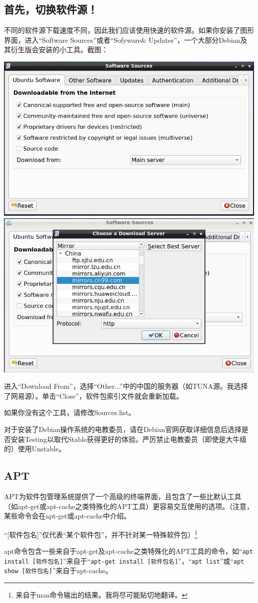 \subsection{首先，切换软件源！}
不同的软件源下载速度不同，因此我们应该使用快速的软件源。如果你安装了图形界面，进入“Software Sources”或者“Sofyware\& Updates”，一个大部分Debian及其衍生版会安装的小工具。截图：
\begin{center}
	\includegraphics[width=0.7\linewidth]{pic/src1}	\includegraphics[width=0.7\linewidth]{pic/src2}
\end{center} \par
进入“Download From”，选择“Other...”中的中国的服务器（如TUNA源。我选择了网易源）。单击“Close”，软件包索引文件就会重新加载。\par
如果你没有这个工具，请修改Sources.list。\par
对于安装了Debian操作系统的电教委员，请在Debian官网获取详细信息后选择是否安装Testing以取代Stable获得更好的体验。严厉禁止电教委员（即使是大牛级的）使用Unstable。
\subsection{APT}
\cite{manAPT}\par
APT为软件包管理系统提供了一个高级的终端界面，且包含了一些比默认工具（如apt-get或apt-cache之类特殊化的APT工具）更容易交互使用的选项。（注意，某些命令会在apt-get或apt-cache中介绍。 \par “[软件包名]”仅代表“某个软件包”，并不针对某一特殊软件包）\footnote{来自于man命令输出的结果。我将尽可能贴切地翻译。 }\par apt命令包含一些来自于apt-get及apt-cache之类特殊化的APT工具的命令，如“\verb|apt install [软件包名]|”来自于“\verb|apt-get install [软件包名]|”，“\verb|apt list|”或“\verb|apt show [软件包名]|”来自于apt-cache。\par
